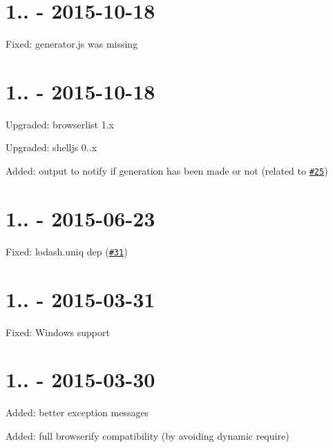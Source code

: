 \section*{1.. -\/ 2015-\/10-\/18}


\begin{DoxyItemize}
\item Fixed\+: {\ttfamily generator.\+js} was missing
\end{DoxyItemize}

\section*{1.. -\/ 2015-\/10-\/18}


\begin{DoxyItemize}
\item Upgraded\+: browserlist 1.\+x
\item Upgraded\+: shelljs 0..\+x
\item Added\+: output to notify if generation has been made or not (related to \href{https://github.com/Nyalab/caniuse-api/issues/25}{\tt \#25})
\end{DoxyItemize}

\section*{1.. -\/ 2015-\/06-\/23}


\begin{DoxyItemize}
\item Fixed\+: lodash.\+uniq dep (\href{https://github.com/Nyalab/caniuse-api/issues/31}{\tt \#31})
\end{DoxyItemize}

\section*{1.. -\/ 2015-\/03-\/31}


\begin{DoxyItemize}
\item Fixed\+: Windows support
\end{DoxyItemize}

\section*{1.. -\/ 2015-\/03-\/30}


\begin{DoxyItemize}
\item Added\+: better exception messages
\item Added\+: full browserify compatibility (by avoiding dynamic require)
\end{DoxyItemize}

